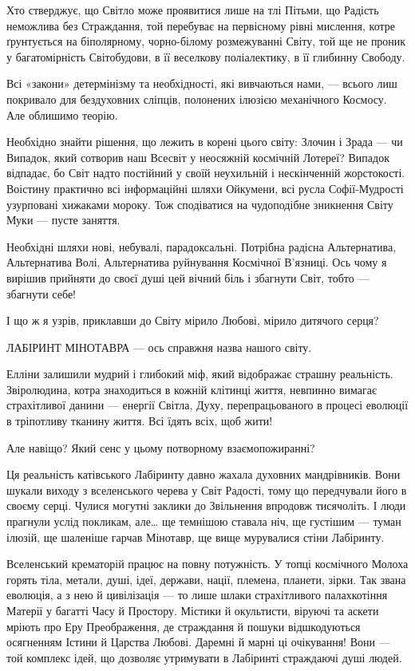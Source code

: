 Хто стверджує, що Світло може проявитися лише на тлі Пітьми, що Радість неможлива без Страждання, той перебуває на первісному рівні мислення, котре ґрунтується на біполярному, чорно-білому розмежуванні Світу, той ще не проник у багатомірність Світобудови, в її веселкову поліалектику, в її глибинну Свободу.

Всі «закони» детермінізму та необхідності, які вивчаються нами, — всього лиш покривало для бездуховних сліпців, полонених ілюзією механічного Космосу. Але облишимо теорію.

Необхідно знайти рішення, що лежить в корені цього світу: Злочин і Зрада — чи Випадок, який сотворив наш Всесвіт у неосяжній космічній Лотереї? Випадок відпадає, бо Світ надто постійний у своїй неухильній і нескінченній жорстокості. Воістину практично всі інформаційні шляхи Ойкумени, всі русла Софії-Мудрості узурповані хижаками мороку. Тож сподіватися на чудоподібне зникнення Світу Муки — пусте заняття.

Необхідні шляхи нові, небувалі, парадоксальні. Потрібна радісна Альтернатива,
Альтернатива Волі, Альтернатива руйнування Космічної В’язниці. Ось чому я
вирішив прийняти до своєї душі цей вічний біль і збагнути Світ, тобто —
збагнути себе!

І що ж я узрів, приклавши до Світу мірило Любові, мірило дитячого серця?

ЛАБІРИНТ МІНОТАВРА — ось справжня назва нашого світу.

Елліни залишили мудрий і глибокий міф, який відображає страшну реальність.
Звіролюдина, котра знаходиться в кожній клітинці життя, невпинно вимагає
страхітливої данини — енергії Світла, Духу, перепрацьованого в процесі еволюції
в тріпотливу тканину життя. Всі їдять всіх, щоб жити!

Але навіщо? Який сенс у цьому потворному взаємопожиранні?

Ця реальність катівського Лабіринту давно жахала духовних мандрівників. Вони
шукали виходу з вселенського черева у Світ Радості, тому що передчували його в
своєму серці. Чулися могутні заклики до Звільнення впродовж тисячоліть. І люди
прагнули услід покликам, але… ще темнішою ставала ніч, ще густішим — туман
ілюзій, ще шаленіше гарчав Мінотавр, ще вище мурувалися стіни Лабіринту.

Вселенський крематорій працює на повну потужність. У топці космічного Молоха
горять тіла, метали, душі, ідеї, держави, нації, племена, планети, зірки. Так
звана еволюція, а з нею й цивілізація — то лише шлаки страхітливого
палахкотіння Матерії у багатті Часу й Простору. Містики й окультисти, віруючі
та аскети мріють про Еру Преображення, де страждання й пошуки відшкодуються
осягненням Істини й Царства Любові. Даремні й марні ці очікування! Вони — той
комплекс ідей, що дозволяє утримувати в Лабіринті страждаючі душі людей.

